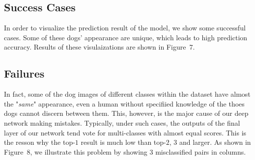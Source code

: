 \documentclass{article}
\begin{document}
\subsection{Success Cases}
In order to visualize the prediction result of the model, we show some successful cases. Some of these dogs' appearance are unique, which leads to high prediction accuracy. Results of these visulaizations are shown in Figure~7. 

\subsection{Failures}
In fact, some of the dog images of different classes within the dataset have almost the "\emph{same}" appearance, even a human without specifiied knowledge of the thoes dogs cannot discern between them. This, however, is the major cause of our deep network making mistakes. 
Typically, under such cases, the outputs of the final layer of our network tend vote for  multi-classes with almost equal scores. This is the resson why the top-$1$ result is much low than top-$2$, $3$ and larger. As shown in Figure~8, we illustrate this problem by showing $3$ misclassified pairs in columns.
\end{document}
